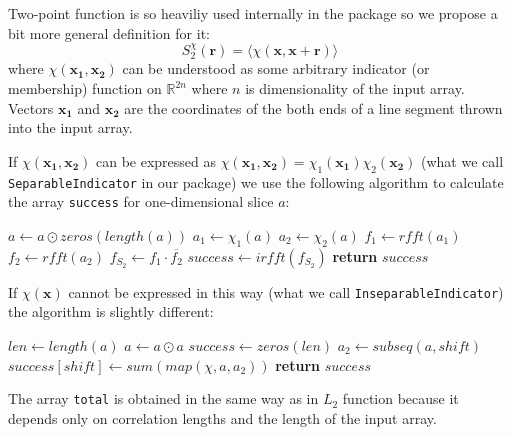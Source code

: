 \documentclass[reprint,amsmath,amssymb,aps,pre]{revtex4-1}
\newcommand{\code}[1]{\colorbox{light-gray}{\texttt{#1}}}
\begin{document}
Two-point function is so heaviliy used internally in the package so we propose a
bit more general definition for it:
\begin{equation}
  S_2^{\chi}(\bm{r}) = \langle \chi(\bm{x}, \bm{x} + \bm{r}) \rangle
  \label{eq:s2gen}
\end{equation}
where $\chi(\bm{x_1}, \bm{x_2})$ can be understood as some arbitrary indicator
(or membership) function on $\mathbb{R}^{2n}$ where $n$ is dimensionality of the
input array. Vectors $\bm{x_1}$ and $\bm{x_2}$ are the coordinates of the both
ends of a line segment thrown into the input array.

If $\chi(\bm{x_1}, \bm{x_2})$ can be expressed as
$\chi(\bm{x_1}, \bm{x_2}) = \chi_1(\bm{x_1})\chi_2(\bm{x_2})$ (what we call
\code{SeparableIndicator} in our package) we use the following algorithm to
calculate the array \code{success} for one-dimensional slice $a$:
\begin{algorithmic}[1]
    \State $a \gets a \odot zeros(length(a))$ 
  \EndIf
  \State $a_1 \gets \chi_1(a)$ 
  \State $a_2 \gets \chi_2(a)$ 
  \State $f_1 \gets rfft(a_1)$ 
  \State $f_2 \gets rfft(a_2)$
  \State $f_{S_2} \gets f_1 \cdot \overline{f_2}$ 
  \State $success \gets irfft(f_{S_2})$ 
  \State \textbf{return} $success$
  \EndProcedure
\end{algorithmic}

If $\chi(\bm{x})$ cannot be expressed in this way (what we call
\code{InseparableIndicator}) the algorithm is slightly different:
\begin{algorithmic}[1]
    \State $len \gets length(a)$
      \State $a \gets a \odot a$
    \EndIf
    \State $success \gets zeros(len)$
      \State $a_2 \gets subseq(a, shift)$
      \State $success[shift] \gets sum(map(\chi, a, a_2))$
    \EndFor
    \State \textbf{return} $success$
  \EndProcedure
\end{algorithmic}

The array \code{total} is obtained in the same way as in $L_2$ function because
it depends only on correlation lengths and the length of the input array.
\end{document}
